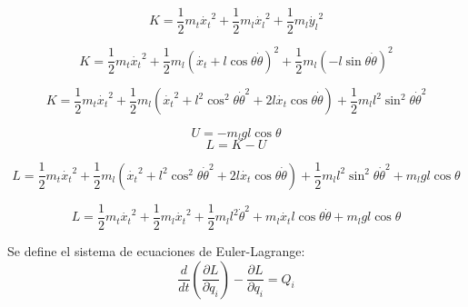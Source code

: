 \documentclass{article}
\begin{document}
            \begin{equation}\label{eq:kinetic2}
                K = \frac{1}{2}m_t\dot{x_t}^2   +\frac{1}{2}m_l\dot{x_l}^2  +\frac{1}{2}m_l\dot{y_l}^2
            \end{equation}

            \begin{equation}\label{eq:kinetic3}
                K = \frac{1}{2}m_t\dot{x_t}^2   +\frac{1}{2}m_l(\dot{x_t}+l\cos{\theta}\dot{\theta})^2  +\frac{1}{2}m_l(-l\sin{\theta}\dot{\theta})^2
            \end{equation}

            \begin{equation}\label{eq:kinetic4}
                    K = \frac{1}{2}m_t\dot{x_t}^2 +\frac{1}{2}m_l(\dot{x_t}^2+l^2\cos^2{\theta}\dot{\theta}^2
                    +2l\dot{x_t}\cos{\theta}\dot{\theta})+\frac{1}{2}m_ll^2\sin^2{\theta}\dot{\theta}^2
            \end{equation}

            \begin{equation}\label{eq:potential}
                U = -m_lgl\cos{\theta}
            \end{equation}
            \begin{equation}\label{eq:lagrange}
                L = K - U
            \end{equation}

            \begin{equation}\label{eq:lagrange2}
                    L = \frac{1}{2}m_t\dot{x_t}^2
                    +\frac{1}{2}m_l(\dot{x_t}^2
                +l^2\cos^2{\theta}\dot{\theta}^2
                +2l\dot{x_t}\cos{\theta}\dot{\theta})
                +\frac{1}{2}m_ll^2\sin^2{\theta}\dot{\theta}^2
                +m_lgl\cos{\theta}
            \end{equation}

            \begin{equation}\label{eq:lagrange3}
                L = \frac{1}{2}m_t\dot{x_t}^2+\frac{1}{2}m_l\dot{x_t}^2
                +\frac{1}{2}m_ll^2\dot{\theta}^2
                +m_l\dot{x_t}l\cos{\theta}\dot{\theta}
                +m_lgl\cos{\theta}
            \end{equation}

            Se define el sistema de ecuaciones de Euler-Lagrange:
            \begin{equation}\label{eq:euler1}
                \frac{d}{dt}\left(\frac{\partial L}{\partial \dot{q}_i}\right)-\frac{\partial L}{\partial q_i}=Q_i
            \end{equation}
\end{document}
